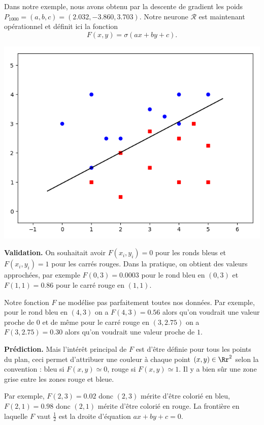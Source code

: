 \begin{exemple}{}{}
	Dans notre exemple, nous avons obtenu par la descente de gradient les poids $P_{1000} = (a,b,c) = (2.032, -3.860, 3.703)$.
	Notre neurone $\mathcal{R}$ est maintenant opérationnel et définit ici la fonction 
	$$F(x,y) = \sigma(ax+by+c).$$
	
	\begin{center}
		\includegraphics[scale=\myscale,scale=0.45]{figures/retro_01_e}
	\end{center}
	
	\textbf{Validation.} On souhaitait avoir $F(x_i,y_i)=0$ pour les ronds bleus et $F(x_i,y_i)=1$ pour les carrés rouges.
	Dans la pratique, on obtient des valeurs approchées, par exemple $F(0,3)=0.0003$ pour le rond bleu en $(0,3)$ et $F(1,1)=0.86$ pour le carré rouge en $(1,1)$.
	
	Notre fonction $F$ ne modélise pas parfaitement toutes nos données. Par exemple, pour le rond bleu en $(4,3)$ on a $F(4,3) = 0.56$ alors qu'on voudrait une valeur proche de $0$ et de même pour le carré rouge en $(3,2.75)$ on a $F(3,2.75) = 0.30$ alors qu'on voudrait une valeur proche de $1$. 
	
	\textbf{Prédiction.} Mais l'intérêt principal de $F$ est d'être définie pour tous les points du plan, ceci permet d'attribuer une couleur à chaque point $(x,y) \in \Rr^2$ selon la convention : bleu si $F(x,y)\simeq 0$, rouge si $F(x,y) \simeq 1$. Il y a bien sûr une \og{}zone grise\fg{} entre les zones rouge et bleue.
	
	Par exemple, $F(2,3) = 0.02$ donc $(2,3)$ mérite d'être colorié en bleu, $F(2,1) = 0.98$ donc $(2,1)$ mérite d'être colorié en rouge.
	La frontière en laquelle $F$ vaut $\frac12$ est la droite d'équation $ax+by+c=0$.
	

\end{exemple}
